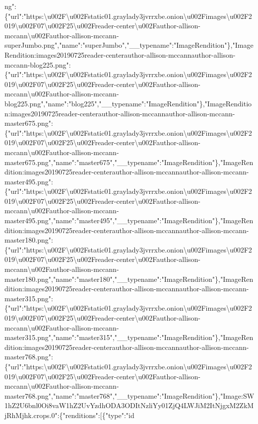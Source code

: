ng":\{"url":"https:\textbackslash{}u002F\textbackslash{}u002Fstatic01.graylady3jvrrxbe.onion\textbackslash{}u002Fimages\textbackslash{}u002F2019\textbackslash{}u002F07\textbackslash{}u002F25\textbackslash{}u002Freader-center\textbackslash{}u002Fauthor-allison-mccann\textbackslash{}u002Fauthor-allison-mccann-superJumbo.png","name":"superJumbo","\_\_typename":"ImageRendition"\},"ImageRendition:images20190725reader-centerauthor-allison-mccannauthor-allison-mccann-blog225.png":\{"url":"https:\textbackslash{}u002F\textbackslash{}u002Fstatic01.graylady3jvrrxbe.onion\textbackslash{}u002Fimages\textbackslash{}u002F2019\textbackslash{}u002F07\textbackslash{}u002F25\textbackslash{}u002Freader-center\textbackslash{}u002Fauthor-allison-mccann\textbackslash{}u002Fauthor-allison-mccann-blog225.png","name":"blog225","\_\_typename":"ImageRendition"\},"ImageRendition:images20190725reader-centerauthor-allison-mccannauthor-allison-mccann-master675.png":\{"url":"https:\textbackslash{}u002F\textbackslash{}u002Fstatic01.graylady3jvrrxbe.onion\textbackslash{}u002Fimages\textbackslash{}u002F2019\textbackslash{}u002F07\textbackslash{}u002F25\textbackslash{}u002Freader-center\textbackslash{}u002Fauthor-allison-mccann\textbackslash{}u002Fauthor-allison-mccann-master675.png","name":"master675","\_\_typename":"ImageRendition"\},"ImageRendition:images20190725reader-centerauthor-allison-mccannauthor-allison-mccann-master495.png":\{"url":"https:\textbackslash{}u002F\textbackslash{}u002Fstatic01.graylady3jvrrxbe.onion\textbackslash{}u002Fimages\textbackslash{}u002F2019\textbackslash{}u002F07\textbackslash{}u002F25\textbackslash{}u002Freader-center\textbackslash{}u002Fauthor-allison-mccann\textbackslash{}u002Fauthor-allison-mccann-master495.png","name":"master495","\_\_typename":"ImageRendition"\},"ImageRendition:images20190725reader-centerauthor-allison-mccannauthor-allison-mccann-master180.png":\{"url":"https:\textbackslash{}u002F\textbackslash{}u002Fstatic01.graylady3jvrrxbe.onion\textbackslash{}u002Fimages\textbackslash{}u002F2019\textbackslash{}u002F07\textbackslash{}u002F25\textbackslash{}u002Freader-center\textbackslash{}u002Fauthor-allison-mccann\textbackslash{}u002Fauthor-allison-mccann-master180.png","name":"master180","\_\_typename":"ImageRendition"\},"ImageRendition:images20190725reader-centerauthor-allison-mccannauthor-allison-mccann-master315.png":\{"url":"https:\textbackslash{}u002F\textbackslash{}u002Fstatic01.graylady3jvrrxbe.onion\textbackslash{}u002Fimages\textbackslash{}u002F2019\textbackslash{}u002F07\textbackslash{}u002F25\textbackslash{}u002Freader-center\textbackslash{}u002Fauthor-allison-mccann\textbackslash{}u002Fauthor-allison-mccann-master315.png","name":"master315","\_\_typename":"ImageRendition"\},"ImageRendition:images20190725reader-centerauthor-allison-mccannauthor-allison-mccann-master768.png":\{"url":"https:\textbackslash{}u002F\textbackslash{}u002Fstatic01.graylady3jvrrxbe.onion\textbackslash{}u002Fimages\textbackslash{}u002F2019\textbackslash{}u002F07\textbackslash{}u002F25\textbackslash{}u002Freader-center\textbackslash{}u002Fauthor-allison-mccann\textbackslash{}u002Fauthor-allison-mccann-master768.png","name":"master768","\_\_typename":"ImageRendition"\},"Image:SW1hZ2U6bnl0Oi8vaW1hZ2UvYzdhODA3ODItNzliYy01ZjQ4LWJiM2ItNjgxM2ZkMjRhMjhk.crops.0":\{"renditions":{[}\{"type":"id